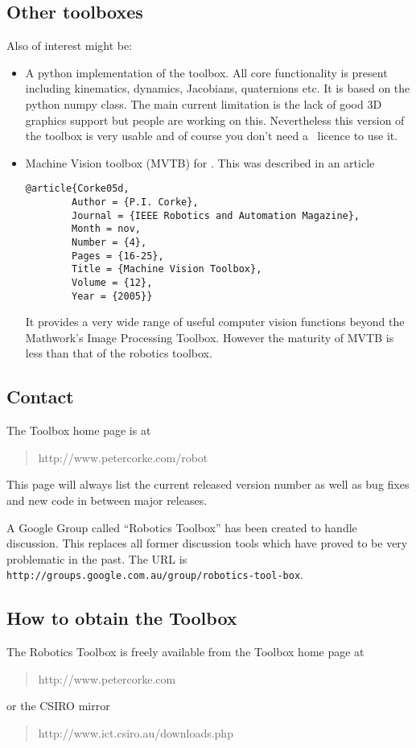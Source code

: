 \documentclass{article}
\begin{document}
\subsection{Other toolboxes}
Also of interest might be:
\begin{itemize}
\item A python implementation of the toolbox.  All core functionality is present including kinematics, dynamics, Jacobians,
quaternions etc.  It is based on the python numpy class.  The main current limitation is the lack of good 3D graphics support
but people are working on this.  Nevertheless this version of the toolbox is very usable and of course you don't need a \Mlab\ licence
to use it.
\item Machine Vision toolbox (MVTB) for {\Mlab}.  This was described in an article
\begin{verbatim}
@article{Corke05d,
        Author = {P.I. Corke},
        Journal = {IEEE Robotics and Automation Magazine},
        Month = nov,
        Number = {4},
        Pages = {16-25},
        Title = {Machine Vision Toolbox},
        Volume = {12},
        Year = {2005}}
\end{verbatim}

It provides a very wide range of useful computer vision functions beyond the Mathwork's Image Processing
Toolbox.  However the maturity of MVTB is less than that of the robotics toolbox.
\end{itemize}

\subsection{Contact}
The Toolbox home page is at
\begin{quote}
http://www.petercorke.com/robot
\end{quote}
This page will always list the current released version number as well as
bug fixes and new code in between major releases. 

A Google Group called ``Robotics Toolbox'' has been created to handle discussion.
This replaces all former discussion tools which have proved to be very problematic in the 
past.  The URL is \texttt{http://groups.google.com.au/group/robotics-tool-box}.

\subsection{How to obtain the Toolbox}
The Robotics Toolbox is freely available from the Toolbox home
page at 
\begin{quote}
http://www.petercorke.com
\end{quote}
or the CSIRO mirror
\begin{quote}
http://www.ict.csiro.au/downloads.php
\end{quote}
\end{document}
